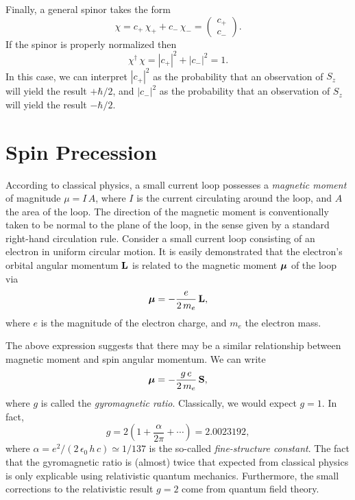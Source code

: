 Finally, a general spinor takes the form
\begin{equation}
\chi = c_+\,\chi_++c_-\,\chi_- =  \left(\begin{array}{c}c_+\\c_-\end{array}\right).
\end{equation}
If the spinor is properly normalized then
\begin{equation}
\chi^\dag\,\chi = |c_+|^2 + |c_-|^2 =1.
\end{equation}
In this case, we can interpret $|c_+|^2$ as the probability that
an observation of $S_z$ will yield the result $+\hbar/2$, and
$|c_-|^2$ as the probability that an observation of $S_z$
will yield the result $-\hbar/2$.

\section{Spin Precession}\label{sspinp}
According to classical physics, a small current loop possesses a {\em magnetic moment}\/ of magnitude $\mu=I\,A$, where
$I$ is the current circulating around the loop, and $A$ the area of the loop.
The direction of the magnetic moment is conventionally taken to be
normal to the plane of the loop, in the sense  given by a standard
right-hand circulation rule. Consider a small current loop consisting of an electron in uniform circular motion. It is
easily demonstrated that the electron's orbital angular momentum ${\bf L}$
is related to the magnetic moment $\mbox{\boldmath$\mu$}$ of the loop via
\begin{equation}\label{e10.57}
\mbox{\boldmath$\mu$} = -\frac{e}{2\,m_e}\,{\bf L},
\end{equation}
where $e$ is the magnitude of the electron charge, and $m_e$ the electron mass.

The above expression suggests that there may be a similar relationship between
magnetic moment and spin angular momentum. We can write
\begin{equation}\label{e10.58}
\mbox{\boldmath$\mu$} = -\frac{g\,e}{2\,m_e}\,{\bf S},
\end{equation}
where $g$ is called the {\em gyromagnetic ratio}. Classically, we would
expect $g=1$. In fact,
\begin{equation}\label{e10.59}
g = 2\left(1+\frac{\alpha}{2\pi}+\cdots\right) = 2.0023192,
\end{equation}
where $\alpha= e^2/(2\,\epsilon_0\,h\,c) \simeq 1/137$ is the so-called
{\em fine-structure constant}. The fact that the gyromagnetic ratio is
(almost) twice that expected from classical physics is only explicable using relativistic
quantum mechanics. Furthermore, the small corrections to the relativistic result $g=2$ come from quantum field theory.

